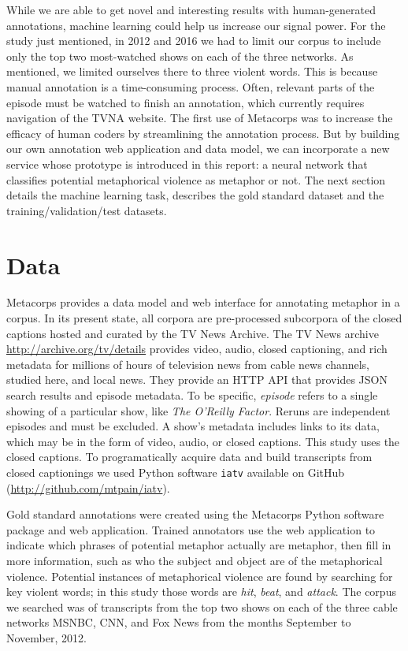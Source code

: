\documentclass[11pt,letterpaper]{amsart}
\begin{document}
While we are able to get novel and interesting results with
human-generated annotations, machine learning could help us increase our
signal power. For the study just mentioned, in 2012 and 2016 we had to
limit our corpus to include only the top two most-watched shows on each
of the three networks. As mentioned, we limited ourselves there to three
violent words. This is because manual annotation is a time-consuming
process. Often, relevant parts of the episode must be watched to finish
an annotation, which currently requires navigation of the TVNA website.
The first use of Metacorps was to increase the efficacy of human coders
by streamlining the annotation process. But by building our own
annotation web application and data model, we can incorporate a new
service whose prototype is introduced in this report: a neural network
that classifies potential metaphorical violence as metaphor or not. The
next section details the machine learning task, describes the gold
standard dataset and the training/validation/test datasets.

\section{Data}\label{data}

Metacorps provides a data model and web interface for annotating
metaphor in a corpus. In its present state, all corpora are
pre-processed subcorpora of the closed captions hosted and curated by
the TV News Archive. The TV News archive
\url{http://archive.org/tv/details} provides video, audio, closed
captioning, and rich metadata for millions of hours of television news
from cable news channels, studied here, and local news. They provide an
HTTP API that provides JSON search results and episode metadata. To be
specific, \emph{episode} refers to a single showing of a particular
show, like \emph{The O'Reilly Factor}. Reruns are independent episodes
and must be excluded. A show's metadata includes links to its data,
which may be in the form of video, audio, or closed captions. This study
uses the closed captions. To programatically acquire data and build
transcripts from closed captionings we used Python software
\texttt{iatv} available on GitHub (\url{http://github.com/mtpain/iatv}).

Gold standard annotations were created using the Metacorps Python
software package and web application. Trained annotators
use the web application to indicate which phrases of potential metaphor
actually are metaphor, then fill in more information, such as who the
subject and object are of the metaphorical violence. Potential instances
of metaphorical violence are found by searching for key violent words;
in this study those words are \emph{hit}, \emph{beat}, and
\emph{attack}. The corpus we searched was of transcripts from the top
two shows on each of the three cable networks MSNBC, CNN, and Fox News from
the months September to November, 2012. 
\end{document}
